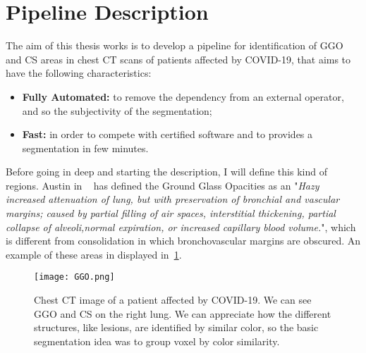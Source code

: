 
	
	\section{Pipeline Description}
	
	
	
	The aim of this thesis works is to develop a pipeline for identification of GGO and CS areas in chest CT scans of patients affected by COVID-19, that aims to have the following characteristics:   
	\begin{itemize}
		\item  \textbf{Fully Automated: } to remove the dependency from an external operator, and so the subjectivity of the segmentation; 
		
		\item \textbf{Fast: } in order to compete with certified software and to provides a segmentation in few minutes.
	\end{itemize}

	Before going in deep and starting the description, I will define this kind of regions. 	
	Austin in ~\cite{ART:Austin} has defined the Ground Glass Opacities as an "\emph{Hazy increased attenuation of lung, but with preservation of bronchial and vascular margins; caused by partial filling of air spaces, interstitial thickening, partial collapse of alveoli,normal expiration, or increased capillary blood volume.}", which is different from consolidation in which bronchovascular margins are obscured. An example of these areas in displayed in \figurename\,\ref{fig:GGO}.

	
	
	\begin{figure}[h!]
		\centering
			\texttt{[image: GGO.png]}
		\caption{Chest CT image of a patient affected by COVID-19. We can see GGO and CS on the right lung. We can appreciate how the different structures, like lesions, are identified by similar color, so the basic segmentation idea was to group voxel by color similarity.}
	\label{fig:GGO}
	\end{figure}

